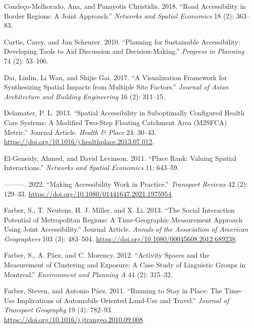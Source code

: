 \documentclass[
]{article}
\newlength{\cslhangindent}
\newenvironment{CSLReferences}[2] %
 {\begin{list}{}{%
  \setlength{\itemindent}{0pt}
  \setlength{\leftmargin}{0pt}
  \setlength{\parsep}{0pt}
  \ifodd #1
   \setlength{\leftmargin}{\cslhangindent}
   \setlength{\itemindent}{-1\cslhangindent}
  \fi
  \setlength{\itemsep}{#2\baselineskip}}}
 {\end{list}}
\begin{document}
\begin{CSLReferences}{1}{0}
Condeço-Melhorado, Ana, and Panayotis Christidis. 2018. {``Road
Accessibility in Border Regions: A Joint Approach.''} \emph{Networks and
Spatial Economics} 18 (2): 363--83.

Curtis, Carey, and Jan Scheurer. 2010. {``Planning for Sustainable
Accessibility: Developing Tools to Aid Discussion and
Decision-Making.''} \emph{Progress in Planning} 74 (2): 53--106.

Dai, Linlin, Li Wan, and Shijie Gai. 2017. {``A Visualization Framework
for Synthesizing Spatial Impacts from Multiple Site Factors.''}
\emph{Journal of Asian Architecture and Building Engineering} 16 (2):
311--15.

Delamater, P. L. 2013. {``Spatial Accessibility in Suboptimally
Configured Health Care Systems: A Modified Two-Step Floating Catchment
Area (M2SFCA) Metric.''} Journal Article. \emph{Health \& Place} 24:
30--43. \url{https://doi.org/10.1016/j.healthplace.2013.07.012}.

El-Geneidy, Ahmed, and David Levinson. 2011. {``Place Rank: Valuing
Spatial Interactions.''} \emph{Networks and Spatial Economics} 11:
643--59.

---------. 2022. {``Making Accessibility Work in Practice.''}
\emph{Transport Reviews} 42 (2): 129--33.
\url{https://doi.org/10.1080/01441647.2021.1975954}.

Farber, S., T. Neutens, H. J. Miller, and X. Li. 2013. {``The Social
Interaction Potential of Metropolitan Regions: A Time-Geographic
Measurement Approach Using Joint Accessibility.''} Journal Article.
\emph{Annals of the Association of American Geographers} 103 (3):
483--504. \url{https://doi.org/10.1080/00045608.2012.689238}.

Farber, S., A. Páez, and C. Morency. 2012. {``Activity Spaces and the
Measurement of Clustering and Exposure: A Case Study of Linguistic
Groups in {Montreal}.''} \emph{Environment and Planning A} 44 (2):
315--32.

Farber, Steven, and Antonio Páez. 2011. {``Running to Stay in Place: The
Time-Use Implications of Automobile Oriented Land-Use and Travel.''}
\emph{Journal of Transport Geography} 19 (4): 782--93.
\url{https://doi.org/10.1016/j.jtrangeo.2010.09.008}.


\end{CSLReferences}
\end{document}

